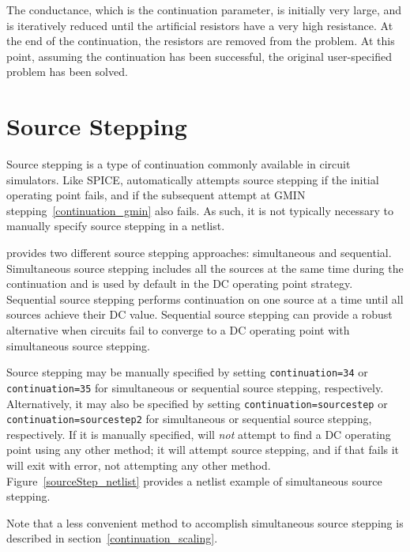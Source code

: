 The conductance, which is the continuation parameter, is initially
very large, and is iteratively reduced until the artificial resistors
have a very high resistance. At the end of the continuation, the
resistors are removed from the problem. At this point, assuming the
continuation has been successful, the original user-specified problem
has been solved.

\newpage 
\section{Source Stepping}
\label{continuation_source}

Source stepping is a type of continuation commonly available in circuit simulators.
Like SPICE, \Xyce{} automatically attempts source stepping if the initial
operating point fails, and if the subsequent attempt at GMIN stepping~\ref{continuation_gmin} 
also fails.  As such, it is not typically necessary to manually 
specify source stepping in a \Xyce{} netlist.  

\Xyce{} provides two different source stepping approaches:  simultaneous and sequential.  
Simultaneous source stepping includes all the sources at the same time during the 
continuation and is used by default in the DC operating point strategy.  
Sequential source stepping performs continuation on one source at a time until all sources 
achieve their DC value.  Sequential source stepping can provide a robust alternative
when circuits fail to converge to a DC operating point with simultaneous source stepping.

Source stepping may be manually specified by setting
\texttt{continuation=34} or \texttt{continuation=35} for simultaneous or sequential source
stepping, respectively.  Alternatively, it may also be specified by setting \texttt{continuation=sourcestep}
or \texttt{continuation=sourcestep2} for simultaneous or sequential source stepping, respectively. 
If it is manually specified,\Xyce{} will \emph{not} attempt to find a DC operating 
point using any other method; it will attempt source stepping, and if that fails 
it will exit with error, not attempting any other method. 
Figure~\ref{sourceStep_netlist} provides a netlist example of simultaneous source stepping.

Note that a less convenient method to accomplish simultaneous source stepping is described in 
section~\ref{continuation_scaling}.


